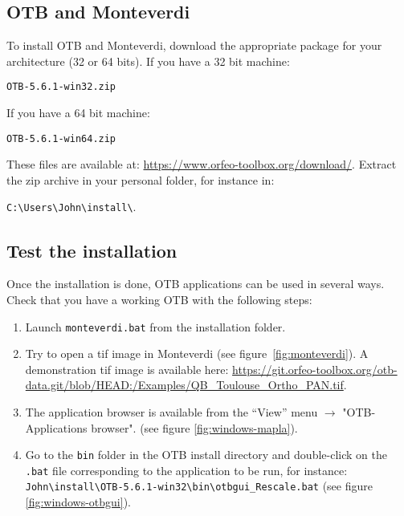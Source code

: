 \documentclass[10pt,a4paper]{article}
\begin{document}
\subsection{OTB and Monteverdi}
To install OTB and Monteverdi, download the appropriate package for your architecture (32 or 64 bits). If you have a 32 bit machine:

\begin{verbatim}
OTB-5.6.1-win32.zip
\end{verbatim}

If you have a 64 bit machine:

\begin{verbatim}
OTB-5.6.1-win64.zip
\end{verbatim}

These files are available at:
\url{https://www.orfeo-toolbox.org/download/}.
Extract the zip archive in your personal folder, for instance in:\\
\begin{centering}
\texttt{C:{\textbackslash}Users{\textbackslash}John{\textbackslash}install{\textbackslash}}.
\end{centering}

\subsection{Test the installation}
Once the installation is done, OTB applications can be used in several ways. Check that you have a working OTB with the following steps:
\begin{enumerate}

\item Launch \texttt{monteverdi.bat} from the installation folder.

\item Try to open a tif image in Monteverdi (see
figure~\ref{fig:monteverdi}). A demonstration tif image is available here: \url{https://git.orfeo-toolbox.org/otb-data.git/blob/HEAD:/Examples/QB\_Toulouse\_Ortho\_PAN.tif}.

\item The application browser is available from the ``View'' menu 
$\rightarrow$ "OTB-Applications browser".
(see figure \ref{fig:windows-mapla}).

\item Go to the \texttt{bin} folder in the OTB install directory and double-click on the \texttt{.bat} file corresponding to the application to be run, for instance:\\
\texttt{John{\textbackslash}install{\textbackslash}OTB-5.6.1-win32{\textbackslash}bin{\textbackslash}otbgui\_Rescale.bat}
(see figure \ref{fig:windows-otbgui}).

\end{enumerate}
\end{document}
